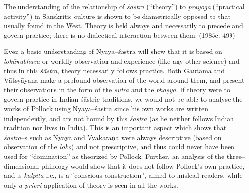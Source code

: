 \begin{myquote}
The understanding of the relationship of \textit{śāstra} (“theory”) to \textit{prayoga} (“practical activity”) in Sanskritic culture is shown to be diametrically opposed to that usually found in the West. Theory is held always and necessarily to precede and govern practice; there is no dialectical interaction between them. (1985c: 499)
\end{myquote}

Even a basic understanding of Nyāya–śāstra will show that it is based on \textit{lokānubhava} or worldly observation and experience (like any other science) and thus in this \textit{śāstra}, theory necessarily follows practice. Both Gautama and Vātsyāyana make a profound observation of the world around them, and present their observations in the form of the \textit{sūtra} and the\textit{ bhāṣya}. If theory were to govern practice in Indian śāstric traditions, we would not be able to analyse the works of Pollock using Nyāya–śāstra since his own works are written independently, and are not bound by this \textit{śāstra }(as he neither follows Indian tradition nor lives in India). This is an important aspect which shows that \textit{śāstra}–s such as Nyāya and Vyākaraṇa were always descriptive (based on observation of the \textit{loka}) and not prescriptive, and thus could never have been used for “domination” as theorized by Pollock. Further, an analysis of the three–dimensional philology would show that it does not follow Pollock’s own practice, and is \textit{kalpita} i.e., is a “conscious construction”, aimed to mislead readers, while only \textit{a priori} application of theory is seen in all the works.


